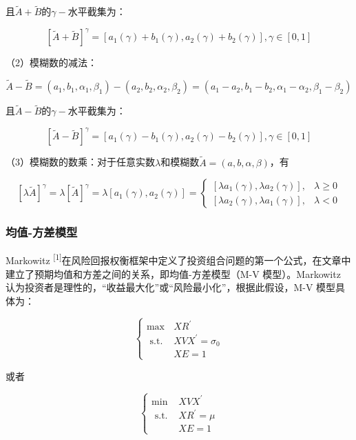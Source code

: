 \documentclass[]{article}
\begin{document}
且\(\widetilde{A}+\widetilde{B}\)的\(\gamma-\)水平截集为：

\[[\tilde{A}+\tilde{B}]^{\gamma}=\left[a_{1}(\gamma)+b_{1}(\gamma), a_{2}(\gamma)+b_{2}(\gamma)\right], \gamma \in[0,1]\]

（2）模糊数的减法：

\[\tilde{A}-\tilde{B}=\left(a_{1}, b_{1}, \alpha_{1}, \beta_{1}\right)-\left(a_{2}, b_{2}, \alpha_{2}, \beta_{2}\right)=\left(a_{1}-a_{2}, b_{1}-b_{2}, \alpha_{1}-\alpha_{2}, \beta_{1}-\beta_{2}\right)\]

且\(\widetilde{A}-\widetilde{B}\)的\(\gamma-\)水平截集为：

\[[\tilde{A}-\tilde{B}]^{\gamma}=\left[a_{1}(\gamma)-b_{1}(\gamma), a_{2}(\gamma)-b_{2}(\gamma)\right], \gamma \in[0,1]\]

（3）模糊数的数乘：对于任意实数\(\lambda\)和模糊数\(\tilde{A}=(a, b, \alpha, \beta)\)，有

\[[\lambda \tilde{A}]^{\gamma}=\lambda[\tilde{A}]^{\gamma}=\lambda\left[a_{1}(\gamma), a_{2}(\gamma)\right]=\left\{\begin{array}{ll}
{\left[\lambda a_{1}(\gamma), \lambda a_{2}(\gamma)\right],} & \lambda \geq 0 \\
{\left[\lambda a_{2}(\gamma), \lambda a_{1}(\gamma)\right],} & \lambda<0
\end{array}\right.\]

\hypertarget{header-n40}{%
\subsubsection{均值-方差模型}\label{header-n40}}

Markowitz
\textsuperscript{{[}1{]}}在风险回报权衡框架中定义了投资组合问题的第一个公式，在文章中建立了预期均值和方差之间的关系，即均值-方差模型（M-V
模型）。Markowitz
认为投资者是理性的，``收益最大化''或``风险最小化''，根据此假设，M-V
模型具体为：

\[\left\{\begin{array}{ll}
\max & X R^{\prime} \\
\text { s.t. } & X V X^{\prime}=\sigma_{0} \\
& X E=1
\end{array}\right.\]

或者

\[\left\{\begin{array}{ll}
\min & X V X^{\prime} \\
\text { s.t. } & X R^{\prime}=\mu \\
& X E=1
\end{array}\right.\]
\end{document}
